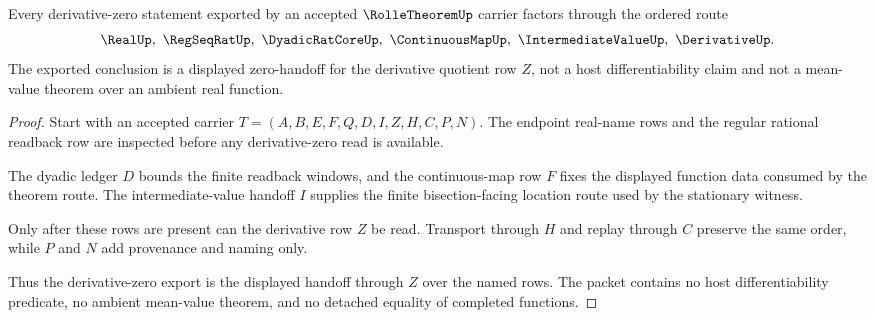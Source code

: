 \begin{theorem}
\label{thm:rolle-theorem-derivative-zero-handoff}
Every derivative-zero statement exported by an accepted $\RolleTheoremUp$ carrier factors through the ordered route
$$
\RealUp,\ \RegSeqRatUp,\ \DyadicRatCoreUp,\ \ContinuousMapUp,\ \IntermediateValueUp,\ \DerivativeUp.
$$
The exported conclusion is a displayed zero-handoff for the derivative quotient row $Z$, not a host differentiability claim and not a mean-value theorem over an ambient real function.
\end{theorem}
\begin{proof}
Start with an accepted carrier $T=(A,B,E,F,Q,D,I,Z,H,C,P,N)$. The endpoint real-name rows and the regular rational readback row are inspected before any derivative-zero read is available.

The dyadic ledger $D$ bounds the finite readback windows, and the continuous-map row $F$ fixes the displayed function data consumed by the theorem route. The intermediate-value handoff $I$ supplies the finite bisection-facing location route used by the stationary witness.

Only after these rows are present can the derivative row $Z$ be read. Transport through $H$ and replay through $C$ preserve the same order, while $P$ and $N$ add provenance and naming only.

Thus the derivative-zero export is the displayed handoff through $Z$ over the named rows. The packet contains no host differentiability predicate, no ambient mean-value theorem, and no detached equality of completed functions.
\end{proof}

